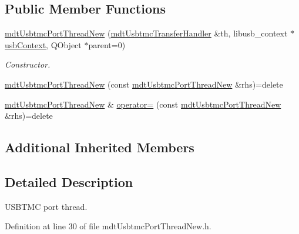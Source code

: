 \subsection*{Public Member Functions}
\begin{DoxyCompactItemize}
\item 
\hyperlink{classmdt_usbtmc_port_thread_new_ad26bff8c543252e40db2c26c9699039a}{mdt\-Usbtmc\-Port\-Thread\-New} (\hyperlink{classmdt_usbtmc_transfer_handler}{mdt\-Usbtmc\-Transfer\-Handler} \&th, libusb\-\_\-context $\ast$\hyperlink{classmdt_usb_port_thread_new_a236b21eb4da1bfb1918c2d30afc85ef5}{usb\-Context}, Q\-Object $\ast$parent=0)
\begin{DoxyCompactList}\small\item\em Constructor. \end{DoxyCompactList}\item 
\hyperlink{classmdt_usbtmc_port_thread_new_a38635c8efafa35f7ceda41f1ef8df534}{mdt\-Usbtmc\-Port\-Thread\-New} (const \hyperlink{classmdt_usbtmc_port_thread_new}{mdt\-Usbtmc\-Port\-Thread\-New} \&rhs)=delete
\item 
\hyperlink{classmdt_usbtmc_port_thread_new}{mdt\-Usbtmc\-Port\-Thread\-New} \& \hyperlink{classmdt_usbtmc_port_thread_new_a55525a82833f0966973691be89bed44d}{operator=} (const \hyperlink{classmdt_usbtmc_port_thread_new}{mdt\-Usbtmc\-Port\-Thread\-New} \&rhs)=delete
\end{DoxyCompactItemize}
\subsection*{Additional Inherited Members}


\subsection{Detailed Description}
U\-S\-B\-T\-M\-C port thread. 

Definition at line 30 of file mdt\-Usbtmc\-Port\-Thread\-New.\-h.



